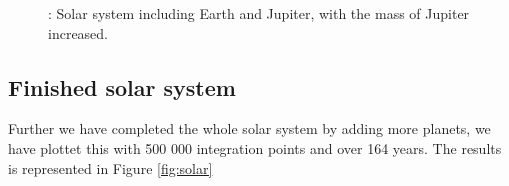 \documentclass{article}
\begin{document}
\begin{figure}[H]
    \caption{: Solar system including Earth and Jupiter, with the mass of Jupiter increased.}
    \label{fig:jupiter}
    \end{figure}

\subsection{Finished solar system}
Further we have completed the whole solar system by adding more planets, we have plottet this with 500 000 integration points and over 164 years. The results is represented in Figure \ref{fig:solar}
\end{document}
